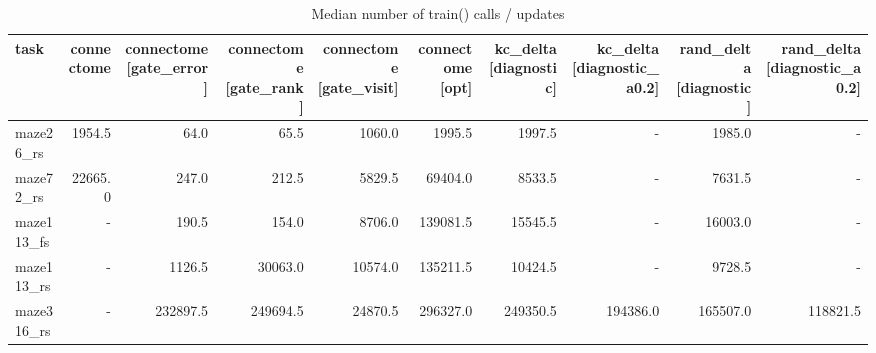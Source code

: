 \begin{table}[t]
\centering
\small
\begin{tabular}{lrrrrrrrrr}
\toprule
task & connectome & connectome [gate\_error] & connectome [gate\_rank] & connectome [gate\_visit] & connectome [opt] & kc\_delta [diagnostic] & kc\_delta [diagnostic\_a0.2] & rand\_delta [diagnostic] & rand\_delta [diagnostic\_a0.2] \\
\midrule
maze26\_rs & 1954.5 & 64.0 & 65.5 & 1060.0 & 1995.5 & 1997.5 & - & 1985.0 & - \\
maze72\_rs & 22665.0 & 247.0 & 212.5 & 5829.5 & 69404.0 & 8533.5 & - & 7631.5 & - \\
maze113\_fs & - & 190.5 & 154.0 & 8706.0 & 139081.5 & 15545.5 & - & 16003.0 & - \\
maze113\_rs & - & 1126.5 & 30063.0 & 10574.0 & 135211.5 & 10424.5 & - & 9728.5 & - \\
maze316\_rs & - & 232897.5 & 249694.5 & 24870.5 & 296327.0 & 249350.5 & 194386.0 & 165507.0 & 118821.5 \\
\bottomrule
\end{tabular}
\caption{Median number of train() calls / updates}
\label{tab:gridworld_trains}
\end{table}